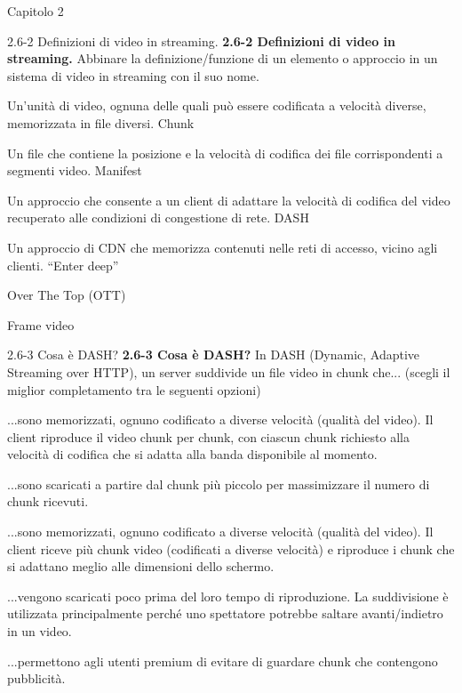 \documentclass[a4paper]{article}
\begin{document}
\begin{quiz}{Capitolo 2}
\begin{matching}[points=1,shuffle]{2.6-2 Definizioni di video in streaming.}
\textbf{2.6-2 Definizioni di video in streaming.}
Abbinare la definizione/funzione di un elemento o approccio in un sistema di video in streaming con il suo nome.
\item Un'unità di video, ognuna delle quali può essere codificata a velocità diverse, memorizzata in file diversi. \answer Chunk
\item Un file che contiene la posizione e la velocità di codifica dei file corrispondenti a segmenti video. \answer Manifest
\item Un approccio che consente a un client di adattare la velocità di codifica del video recuperato alle condizioni di congestione di rete. \answer DASH
\item Un approccio di CDN che memorizza contenuti nelle reti di accesso, vicino agli clienti. \answer ``Enter deep''
\item \answer Over The Top (OTT)
\item \answer Frame video
\end{matching}


\begin{multi}[points=1,shuffle]{2.6-3 Cosa è DASH?}
\textbf{2.6-3 Cosa è DASH?}
In DASH (Dynamic, Adaptive Streaming over HTTP), un server suddivide un file video in chunk che... (scegli il miglior completamento tra le seguenti opzioni)
\item* ...sono memorizzati, ognuno codificato a diverse velocità (qualità del video). Il client riproduce il video chunk per chunk, con ciascun chunk richiesto alla velocità di codifica che si adatta alla banda disponibile al momento.
\item ...sono scaricati a partire dal chunk più piccolo per massimizzare il numero di chunk ricevuti.
\item ...sono memorizzati, ognuno codificato a diverse velocità (qualità del video). Il client riceve più chunk video (codificati a diverse velocità) e riproduce i chunk che si adattano meglio alle dimensioni dello schermo.
\item ...vengono scaricati poco prima del loro tempo di riproduzione. La suddivisione è utilizzata principalmente perché uno spettatore potrebbe saltare avanti/indietro in un video.
\item ...permettono agli utenti premium di evitare di guardare chunk che contengono pubblicità.
\end{multi}


\end{quiz}
\end{document}
